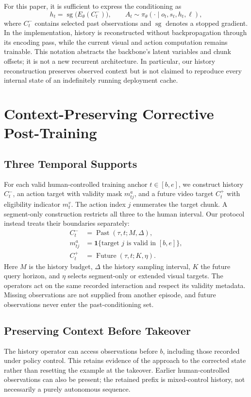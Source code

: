 \documentclass[letterpaper,10pt,conference]{ieeeconf}
\begin{document}
For this paper, it is sufficient to express the conditioning as
\begin{equation}
 h_t=\operatorname{sg}\big(E_\theta(C_t^-)\big),\qquad
 A_t\sim\pi_\theta(\cdot\mid o_t,s_t,h_t,\ell),
 \label{eq:memory}
\end{equation}
where $C_t^-$ contains selected past observations and $\operatorname{sg}$ denotes a stopped gradient. In the implementation, history is reconstructed without backpropagation through its encoding pass, while the current visual and action computation remains trainable. This notation abstracts the backbone's latent variables and chunk offsets; it is not a new recurrent architecture. In particular, our history reconstruction preserves observed context but is not claimed to reproduce every internal state of an indefinitely running deployment cache.

\section{Context-Preserving Corrective Post-Training}
\subsection{Three Temporal Supports}
For each valid human-controlled training anchor $t\in[b,e]$, we construct history $C_t^-$, an action target with validity mask $m^a_{tj}$, and a future video target $C_t^+$ with eligibility indicator $m_t^v$. The action index $j$ enumerates the target chunk. A segment-only construction restricts all three to the human interval. Our protocol instead treats their boundaries separately:
\begin{equation}
\begin{aligned}
 C_t^-&=\operatorname{Past}(\tau,t;M,\Delta),\\
 m^a_{tj}&=\mathbf 1\{\text{target }j\text{ is valid in }[b,e]\},\\
 C_t^+&=\operatorname{Future}(\tau,t;K,\eta).
\end{aligned}
\label{eq:supports}
\end{equation}
Here $M$ is the history budget, $\Delta$ the history sampling interval, $K$ the future query horizon, and $\eta$ selects segment-only or extended visual targets. The operators act on the same recorded interaction and respect its validity metadata. Missing observations are not supplied from another episode, and future observations never enter the past-conditioning set.

\subsection{Preserving Context Before Takeover}
The history operator can access observations before $b$, including those recorded under policy control. This retains evidence of the approach to the corrected state rather than resetting the example at the takeover. Earlier human-controlled observations can also be present; the retained prefix is mixed-control history, not necessarily a purely autonomous sequence.
\end{document}
